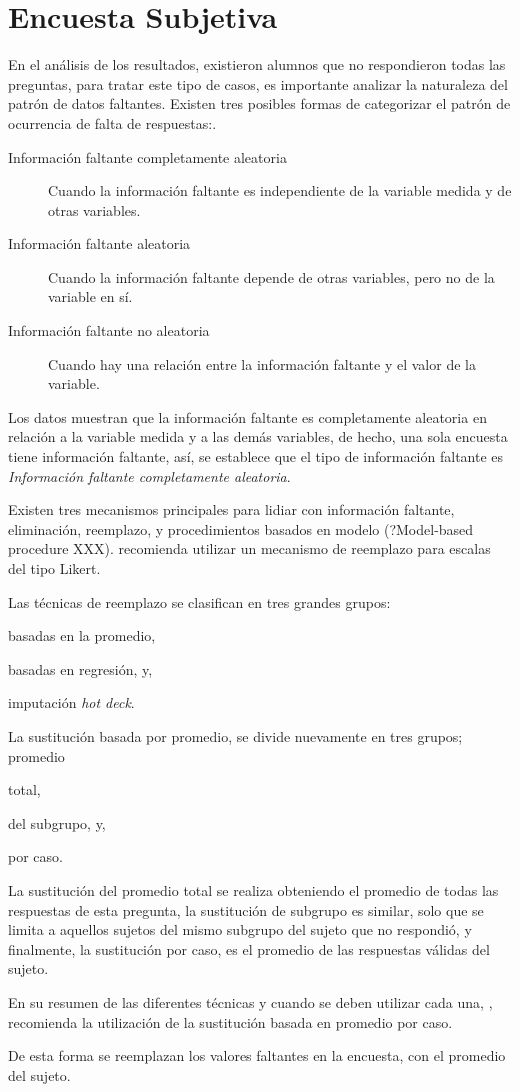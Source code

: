 \section{Encuesta Subjetiva}

En el análisis de los resultados, existieron alumnos que no respondieron todas
las preguntas, para tratar este tipo de casos, es importante analizar la
naturaleza del patrón de datos faltantes\cite{carpita2011imputation}. Existen
tres posibles formas de categorizar el patrón de ocurrencia de falta de
respuestas:\cite{leite2010performance}\cite{leite2010performance}\cite{tsikriktsis2005review}.


\begin{description}
    \item[Información faltante completamente aleatoria] Cuando la información
        faltante es independiente de la variable medida y de otras variables.
    \item[Información faltante aleatoria] Cuando la información faltante depende
        de otras variables, pero no de la variable en sí. 
    \item[Información faltante no aleatoria] Cuando hay una relación entre la
        información faltante y el valor de la variable.
\end{description}

Los datos muestran que la información faltante es completamente aleatoria en
relación a la variable medida y a las demás variables, de hecho, una sola
encuesta tiene información faltante, así, se establece que el tipo de
información faltante es \emph{Información faltante completamente aleatoria}.

Existen tres mecanismos\cite{tsikriktsis2005review} principales para lidiar con
información faltante, eliminación, reemplazo, y procedimientos basados en modelo
(?Model-based procedure XXX).\cite{tsikriktsis2005review} recomienda utilizar
un mecanismo de reemplazo para escalas del tipo Likert.

Las técnicas de reemplazo se clasifican en tres grandes
grupos\cite{tsikriktsis2005review}:
\begin{enumerate*}[label=\itshape\alph*\upshape.]
\item basadas en la promedio,
\item basadas en regresión, y,
\item imputación \emph{hot deck}.
\end{enumerate*}

La sustitución basada por promedio, se divide nuevamente en tres grupos;
promedio
\begin{enumerate*}[label=\itshape\alph*\upshape.]
\item total,
\item del subgrupo, y,
\item por caso.
\end{enumerate*}
La sustitución del promedio total se realiza obteniendo el promedio de todas las
respuestas de esta pregunta, la sustitución de subgrupo es similar, solo que se
limita a aquellos sujetos del mismo subgrupo del sujeto que no respondió, y
finalmente, la sustitución por caso, es el promedio de las respuestas válidas
del sujeto.

En su resumen de las diferentes técnicas y cuando se deben utilizar cada una,
\cite{tsikriktsis2005review}, recomienda la utilización de la sustitución basada
en promedio por caso. 

De esta forma se reemplazan los valores faltantes en la encuesta, con el
promedio del sujeto.
